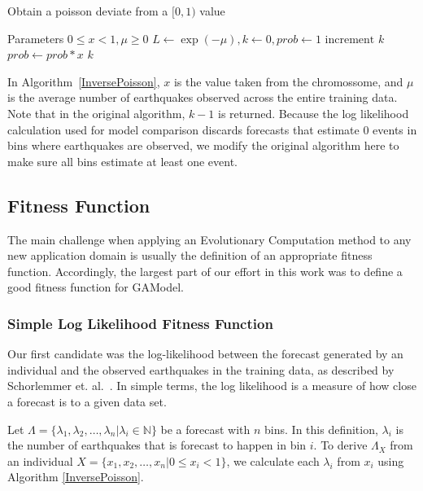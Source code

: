 \documentclass{sig-alternate}
\begin{document}
\begin{algorithm}
  \caption{Obtain a poisson deviate from a $[0,1)$ value}
  \label{InversePoisson}
  \begin{algorithmic}
    \STATE Parameters $0 \leq x < 1, \mu \geq 0$
    \STATE $L \gets \exp{(-\mu)}, k \gets 0, prob \gets 1$
    \REPEAT 
    \STATE $\text{increment }k$
    \STATE $prob \gets prob*x$
    \RETURN $k$
  \end{algorithmic}
\end{algorithm}

In Algorithm~\ref{InversePoisson}, $x$ is the value taken from the
chromossome, and $\mu$ is the average number of earthquakes observed
across the entire training data. Note that in the original algorithm,
$k-1$ is returned. Because the log likelihood calculation used for
model comparison discards forecasts that estimate $0$ events in bins
where earthquakes are observed, we modify the original algorithm here
to make sure all bins estimate at least one event.


\subsection{Fitness Function}

The main challenge when applying an Evolutionary Computation method to
any new application domain is usually the definition of an appropriate
fitness function. Accordingly, the largest part of our effort in this
work was to define a good fitness function for GAModel.

\subsubsection{Simple Log Likelihood Fitness Function} %

Our first candidate was the log-likelihood between the forecast
generated by an individual and the observed earthquakes in the
training data, as described by Schorlemmer
et. al.~\cite{Schorlemmer2007}. In simple terms, the log likelihood is
a measure of how close a forecast is to a given data set.

Let $\Lambda = \{\lambda_1, \lambda_2, \dots, \lambda_n | \lambda_i
\in \mathbb{N}\}$ be a forecast with $n$ bins. In this definition,
$\lambda_i$ is the number of earthquakes that is forecast to happen in
bin $i$. To derive $\Lambda_X$ from an individual $X = \{x_1, x_2,
\dots, x_n | 0 \leq x_i < 1\}$, we calculate each $\lambda_i$ from
$x_i$ using Algorithm \ref{InversePoisson}.
\end{document}
